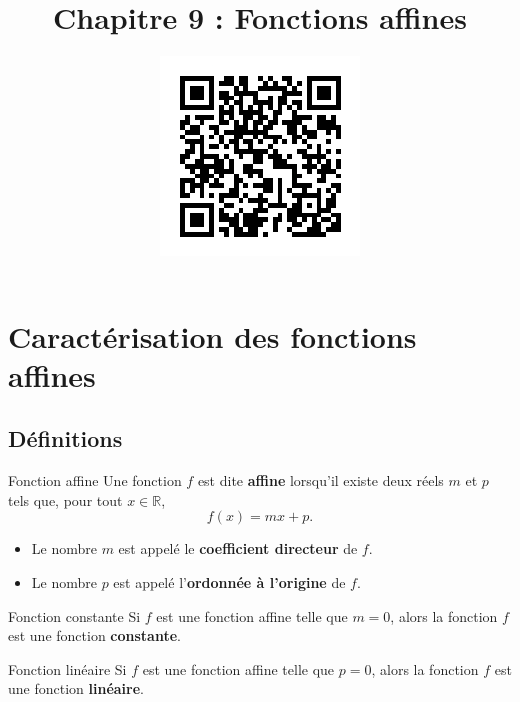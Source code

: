 \documentclass[11pt]{article}
\title{\vspace{-15mm}Chapitre 9 : Fonctions affines}
\date{\vspace{-14mm}
\href{https://erou.forge.aeif.fr/s11/affine.html}{
  \includegraphics[scale=.7]{qrcode.png}}
\vspace{-12mm}}
\author{}
\begin{document}
\maketitle\thispagestyle{fancy}

%


\section{Caractérisation des fonctions affines}
\subsection{Définitions}

\begin{defi}{Fonction affine}
  Une fonction $f$ est dite \textbf{affine} lorsqu'il existe deux réels $m$ et
  $p$ tels que, pour tout $x\in\mathbb{R}$, $$f(x)=mx+p.$$
  \begin{itemize}
    \item Le nombre $m$ est appelé le \textbf{coefficient directeur} de $f$.
    \item Le nombre $p$ est appelé l'\textbf{ordonnée à l'origine} de $f$.
  \end{itemize}
\end{defi}

\begin{defi}{Fonction constante}
  Si $f$ est une fonction affine telle que $m=0$, alors la fonction $f$ est une
  fonction \textbf{constante}.
\end{defi}

\begin{defi}{Fonction linéaire}
  Si $f$ est une fonction affine telle que $p=0$, alors la fonction $f$ est une
  fonction \textbf{linéaire}.
\end{defi}
\end{document}
